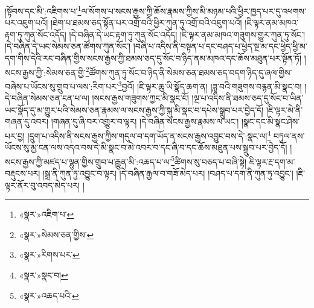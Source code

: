 །སྟོབས་དང་མི་:འཇིགས་པ་\footnote{«སྣར་»འཇིག་པ་}ལ་སོགས་པ་སངས་རྒྱས་ཀྱི་ཆོས་རྣམས་ཀྱིས་མི་མཉམ་པའི་ཕྱིར་ཁྱད་པར་དུ་འཕགས་པར་འཇུག་པའོ། །ཐེག་པ་ཐམས་ཅད་སྟོན་པར་འགྲོ་བའི་ཕྱིར་ཀུན་ཏུ་འགྲོ་བའི་འཇུག་པའོ། །ཇི་ལྟར་ནམ་མཁའ་རྟག་ཏུ་ཀུན་སོང་འདོད། །དེ་བཞིན་དེ་ཡང་རྟག་ཏུ་ཀུན་སོང་འདོད། །ཇི་ལྟར་ནམ་མཁའ་གཟུགས་གྱུར་ཀུན་ཏུ་སོང་། །དེ་བཞིན་དེ་ཡང་སེམས་ཅན་ཚོགས་ཀུན་སོང་། །བཞི་པ་འདིས་ནི་བསྟན་པ་དང་བཤད་པ་ཕྱེད་སྔ་མ་དང་ཕྱེད་ཕྱི་མ་དག་གིས་དེའི་རང་བཞིན་གྱིས་སངས་རྒྱས་ཀྱི་ཐམས་ཅད་དུ་སོང་བ་ཉིད་ནམ་མཁའ་དང་ཆོས་མཐུན་པར་སྟོན་ཏོ། །སངས་རྒྱས་ཀྱི་:སེམས་ཅན་གྱི་\footnote{«སྣར་»སེམས་ཅན་གྱིས་}ཚོགས་ཀུན་ཏུ་སོང་བ་ཉིད་ནི་སེམས་ཅན་ཐམས་ཅད་བདག་ཉིད་དུ་ཞལ་གྱིས་བཞེས་པ་ཡོངས་སུ་གྲུབ་པ་ལས་:རིག་པར་\footnote{«སྣར་»རིགས་པར་}བྱའོ། །ཇི་ལྟར་ཆུ་ཡི་སྣོད་ཆག་ན། །ཟླ་བའི་གཟུགས་བརྙན་མི་སྣང་བ། །དེ་བཞིན་སེམས་ཅན་ངན་པ་ལ། །སངས་རྒྱས་གཟུགས་ཀྱང་མི་སྣང་ངོ། །ལྔ་པ་འདིས་ནི་ཐམས་ཅད་དུ་སོང་བ་ཡིན་ཡང་སྣོད་དུ་མ་གྱུར་པའི་སེམས་ཅན་རྣམས་ལ་སངས་རྒྱས་ཀྱི་སྐུ་མི་སྣང་བ་དཔེས་སྒྲུབ་པར་བྱེད་དོ། །ཇི་ལྟར་མེ་ནི་གཞན་དུ་འབར། །གཞན་དུ་ཞི་བར་འགྱུར་བ་ལྟར། །དེ་བཞིན་སངས་རྒྱས་རྣམས་ལ་ཡང་། །སྣང་དང་མི་སྣང་ཤེས་པར་བྱ། །དྲུག་པ་འདིས་ནི་སངས་རྒྱས་ཀྱིས་གདུལ་བ་དག་ཡོད་ན་སངས་རྒྱས་འབྱུང་བས་དེ་:སྣང་ལ།\footnote{«སྣར་»སྣང་བ།} བཏུལ་ནས་ཡོངས་སུ་མྱ་ངན་ལས་འདའ་བས་དེ་མི་སྣང་བ་མེ་འབར་བ་དང་ཞི་བ་དང་ཆོས་མཐུན་པས་སྒྲུབ་པར་བྱེད་དོ། །སངས་རྒྱས་ཀྱི་མཛད་པ་ལྷུན་གྱིས་གྲུབ་པ་རྒྱུན་མི་:འཆད་པ་ལ་\footnote{«སྣར་»འཆད་པའི་}ཚིགས་སུ་བཅད་པ་བཞི་སྟེ། ཇི་ལྟར་རྔ་དག་མ་བརྡུངས་པར། །སྒྲ་ནི་ཀུན་ཏུ་འབྱུང་བ་ལྟར། །དེ་བཞིན་རྒྱལ་བ་གཟོ་མེད་པར། །བཤད་པ་དག་ནི་ཀུན་ཏུ་འབྱུང་། །ཇི་ལྟར་ནོར་བུ་འབད་མེད་པར། །
